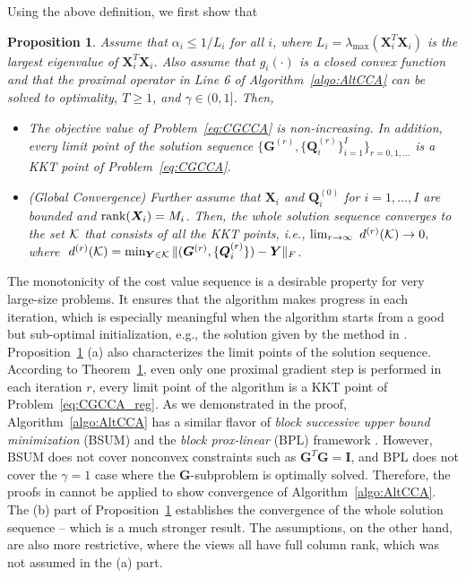 \documentclass[10pt,journal]{IEEEtran}
\newtheorem{Prop}{Proposition}
\newcommand{\G}{\boldsymbol{G}}
\begin{document}
Using the above definition, we first show that
\begin{Prop}\label{lem:monotonicity}
Assume that $\alpha_i \leq 1/L_i$ for all $i$, where $L_i=\lambda_{\max}({\bm X}_i^T{\bm X}_i)$ is the largest eigenvalue of ${\bm X}_i^T{\bm X}_i$.
Also assume that $g_i(\cdot)$ is a closed convex function and that the proximal operator in Line 6 of Algorithm~\ref{algo:AltCCA} can be solved to optimality, $T\geq 1$, and $\gamma\in(0,1]$. Then, 
\begin{itemize}
\item[a)] The objective value of Problem~\eqref{eq:CGCCA} is non-increasing.
In addition, every limit point of the solution sequence $\{{\bm G}^{(r)},\{{\bm Q}^{(r)}_i\}_{i=1}^I\}_{r=0,1,\ldots}$ is a KKT point of Problem~\eqref{eq:CGCCA}.
\item[b)] (Global Convergence) Further assume that ${\bm X}_i$ and ${\bm Q}^{(0)}_i$ for $i=1,\ldots,I$ are bounded and ${\rm rank}({\bm X}_i)=M_i$.
Then, the whole solution sequence converges to the set ${\cal K}$ that consists of all the KKT points, i.e., $\lim_{r\rightarrow \infty}~d^{(r)}({\cal K})\rightarrow 0,$
where $~d^{(r)}({\cal K})=\min_{{\bm Y}\in{\cal K}}\|({\bm G}^{(r)},\{{\bm Q}_i^{(r)}\})-{\bm Y}\|_F$.
\end{itemize}
\end{Prop}
The monotonicity of the cost value sequence is a desirable property for very large-size problems. It ensures that the algorithm makes progress in each iteration, which is especially meaningful when the algorithm starts from a good but sub-optimal initialization, e.g., the solution given by the method in \cite{rastogimultiview}.
Proposition~\ref{lem:monotonicity} (a) also characterizes the limit points of the solution sequence.
According to Theorem~\ref{lem:monotonicity}, even only one proximal gradient step is performed in each iteration $r$, every limit point of the algorithm is a KKT point of Problem~\eqref{eq:CGCCA_reg}.
As we demonstrated in the proof, 
Algorithm~\ref{algo:AltCCA} has a similar flavor of \emph{block successive upper bound minimization} (BSUM) \cite{razaviyayn2013unified} and the \emph{block prox-linear} (BPL) framework \cite{xu2013block,xu2014globally}.
However, BSUM does not cover nonconvex constraints such as $\G^T\G={\bm I}$,
and BPL does not cover the $\gamma=1$ case where the $\G$-subproblem is optimally solved.
Therefore, the proofs in \cite{razaviyayn2013unified,xu2013block,xu2014globally} cannot be applied to show convergence of Algorithm~\ref{algo:AltCCA}. 
The (b) part of Proposition~\ref{lem:monotonicity} establishes the convergence of the whole solution sequence -- which is a much stronger result. The assumptions, on the other hand, are also more restrictive, where the views all have full column rank, which was not assumed in the (a) part.
\end{document}
